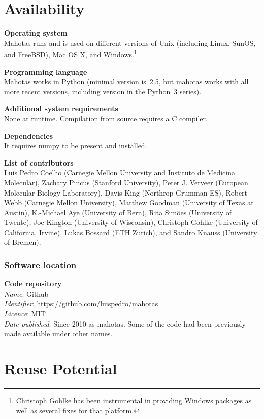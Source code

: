\documentclass{scrartcl}
\newcommand*{\cpp}{{C\nolinebreak[4]\hspace{-.05em}\raisebox{.4ex}{\tiny\textbf{++}}}}
\begin{document}
\section{Availability}

\textbf{Operating system}\\
Mahotas runs and is used on different versions of Unix (including Linux, SunOS,
and FreeBSD), Mac OS X, and Windows.\footnote{Christoph Gohlke has been
instrumental in providing Windows packages as well as several fixes for that
platform.}


\textbf{Programming language}\\
Mahotas works in Python (minimal version is~2.5, but mahotas works with all
more recent versions, including version in the Python~3 series).

\textbf{Additional system requirements}\\
None at runtime. Compilation from source requires a \cpp{} compiler.

\textbf{Dependencies}\\
It requires numpy to be present and installed.


\textbf{List of contributors}\\
Luis Pedro Coelho (Carnegie Mellon University and Instituto de Medicina
Molecular), Zachary Pincus (Stanford University), Peter J. Verveer (European
Molecular Biology Laboratory), Davis King (Northrop Grumman ES), Robert Webb
(Carnegie Mellon University), Matthew Goodman (University of Texas at Austin),
K.-Michael Aye (University of Bern), Rita Sim\~{o}es (University of Twente),
Joe Kington (University of Wisconsin), Christoph Gohlke (University of
California, Irvine), Lukas Bossard (ETH Zurich), and Sandro Knauss (University
of Bremen).

\subsubsection{Software location}

\textbf{Code repository}\\
\textit{Name}: Github\\
\textit{Identifier}: https://github.com/luispedro/mahotas\\
\textit{Licence}: MIT\\
\textit{Date published}: Since 2010 as mahotas. Some of the code had been
previously made available under other names.

\section{Reuse Potential}
\end{document}
